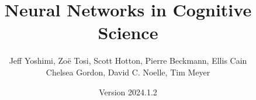 \documentclass[oneside]{book}
\begin{document}
\title{Neural Networks in Cognitive Science}
\author{Jeff Yoshimi, Zo\"e Tosi, Scott Hotton, Pierre Beckmann, Ellis Cain\\ Chelsea Gordon, David C. Noelle, Tim Meyer}
\date{Version 2024.1.2}  %
\maketitle

\tableofcontents





















\appendix


{} 
\listoffigures

{} 
{}

\end{document}
